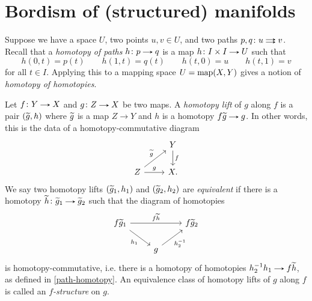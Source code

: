 \section{Bordism of (structured) manifolds}

\begin{definition}
  \label{path-homotopy}
  Suppose we have a space $U$, two points $u,v \in U$, and two paths
  $p,q \c u \doubto v$. Recall that a \emph{homotopy of paths} $h \c p
  \to q$ is a map $h \c I \times I \to U$ such that
  \[
  h(0,t) = p(t) \qquad
  h(1,t) = q(t) \qquad
  h(t,0) = u \qquad
  h(t,1) = v
  \]
  for all $t \in I$. Applying this to a mapping space $U = \operatorname{map}(X,Y)$
  gives a notion of \emph{homotopy of homotopies}.
\end{definition}

\begin{definitions}
  \label{map-f-struct}
  Let $f \c Y \to X$ and $g \c Z \to X$ be two maps. A \emph{homotopy
    lift} of $g$ along $f$ is a pair $(\widetilde g, h)$ where $\widetilde g$ is a
  map $Z \to Y$ and $h$ is a homotopy $f\til g \to g$. In other words,
  this is the data of a homotopy-commutative diagram
  \[
  \begin{tikzcd}
    & Y \ar[d, "f"] \\ Z \ar[ur, "\til g"] \ar[r, "g"] & X.
  \end{tikzcd}
  \]
  We say two homotopy lifts $(\widetilde g_1, h_1)$ and $(\widetilde g_2, h_2)$
  are \emph{equivalent} if there is a homotopy $\til h \c \til g_1 \to
  \til g_2$ such that the diagram of homotopies
  \begin{equation}
    \label{lift-equiv}
    \begin{tikzcd}
      f\til g_1 \ar[rr, "f\til h"] \ar[dr, swap, "h_1"] & & f\til g_2
      \\ & g \ar[ur, swap, "h_2^{-1}"] &
    \end{tikzcd}
  \end{equation}
  is homotopy-commutative, i.e. there is a homotopy of homotopies
  $h_2^{-1}h_1 \to f\til h$, as defined in \eqref{path-homotopy}. An
  equivalence class of homotopy lifts of $g$ along $f$ is called an
  \emph{$f$-structure} on $g$.
\end{definitions}

